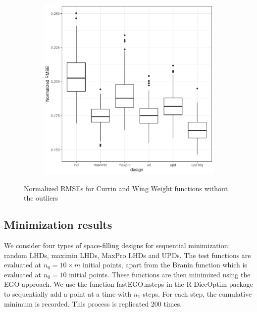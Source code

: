 \documentclass [PhD] {package/uclathes}
\begin{document}
\begin{figure}
\begin{subfigure}[b]{0.45\textwidth}
\includegraphics[width=\textwidth]{chapters/EGO/pdfs/Wingweight_128x31_no_outlier}
\end{subfigure}
\caption{Normalized RMSEs for Currin and Wing Weight functions without the outliers}
\label{fig:no_outlier}
\end{figure}


\clearpage
\subsection{Minimization results}

We consider four types of space-filling designs for sequential minimization: random LHDs, maximin LHDs, MaxPro LHDs and UPDs. The test functions are evaluated at $n_0 = 10\times m$ initial points, apart from the Branin function which is evaluated at $n_0 = 10$ initial points. These functions are then minimized using the EGO approach. We use the function fastEGO.nsteps in the R DiceOptim package to sequentially add a point at a time with $n_1$ steps. For each step, the cumulative minimum is recorded. This process is replicated 200 times.
\end{document}
